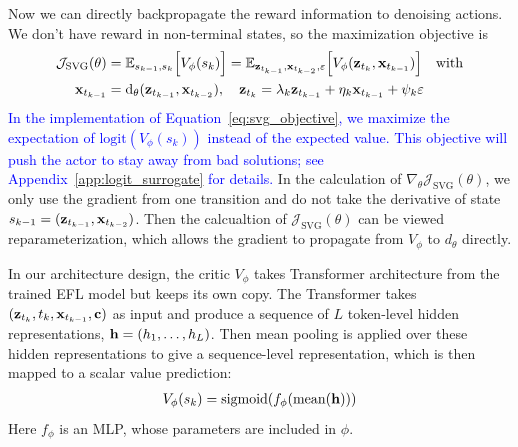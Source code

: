 Now we can directly backpropagate the reward information to denoising actions. We don't have reward in non-terminal states, so the maximization objective is
\begin{align}
 \mathcal{J}_{\mathrm{SVG}}(\theta) &= \mathbb{E}_{s_{k - 1}, s_k} \Bigl[ V_\phi(s_k) \Bigr]\label{eq:svg_objective}
= \mathbb{E}_{{\mathbf{z}}_{t_{k - 1}}, {\mathbf{x}}_{t_{k-2}}, \varepsilon} \Bigl[ V_\phi({\mathbf{z}}_{t_k}, {\mathbf{x}}_{t_{k-1}}) \Bigr] \quad \text{with} \\
{\mathbf{x}}_{t_{k-1}} &= \mathrm{d}_\theta({\mathbf{z}}_{t_{k-1}}, {\mathbf{x}}_{t_{k-2}}),  \quad {\mathbf{z}}_{t_{k}} = \lambda_{k} {\mathbf{z}}_{t_{k-1}} + \eta_k {\mathbf{x}}_{t_{k-1}} + \psi_k \varepsilon
\end{align}
\textcolor{blue}{In the implementation of Equation~\ref{eq:svg_objective}, we maximize the expectation of $\mathrm{logit}(V_\phi(s_k))$ instead of the expected value. This objective will push the actor to stay away from bad solutions; see Appendix~\ref{app:logit_surrogate} for details.}
In the calculation of $\nabla_\theta \mathcal{J}_{\mathrm{SVG}}(\theta)$, we only use the gradient from one transition and do not take the derivative of 
state $s_{k-1} = ({\mathbf{z}}_{t_{k - 1}}, {\mathbf{x}}_{t_{k-2}})$. Then the calcualtion of $\mathcal{J}_{\mathrm{SVG}}(\theta)$ can be viewed reparameterization, 
which allows the gradient to propagate from $V_\phi$ to $d_\theta$ directly.    

In our architecture design, the critic $V_\phi$ takes Transformer architecture from the trained EFL model but keeps its own 
copy. The Transformer takes 
$({\mathbf{z}}_{t_{k}}, t_k, {\mathbf{x}}_{t_{k-1}}, {\mathbf{c}})$ as input and produce a sequence of  
$L$ token-level hidden representations, ${\mathbf{h}} = (h_1, \ldots, h_L)$. Then mean pooling is applied over 
these hidden representations to give a sequence-level representation, which is then mapped to a scalar value prediction:
\begin{align}
\label{eq:value1}
V_{\phi}(s_k) = \mathrm{sigmoid}(f_{\phi}(\mathrm{mean}({\mathbf{h}})))    
\end{align}
Here $f_{\phi}$ is an MLP, whose parameters are included in $\phi$.  




  

